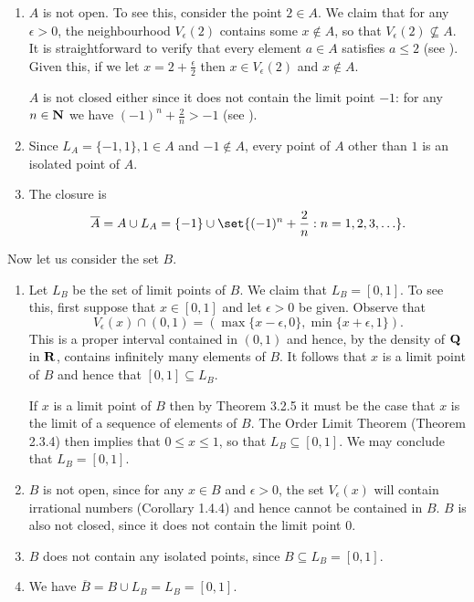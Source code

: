 \documentclass{lew98_solutions}
\begin{document}
\begin{solution}
\begin{enumerate}
        \item \( A \) is not open. To see this, consider the point \( 2 \in A \). We claim that for any \( \epsilon > 0 \), the neighbourhood \( V_{\epsilon}(2) \) contains some \( x \not\in A \), so that \( V_{\epsilon}(2) \not\subseteq A \). It is straightforward to verify that every element \( a \in A \) satisfies \( a \leq 2 \) (see ). Given this, if we let \( x = 2 + \tfrac{\epsilon}{2} \) then \( x \in V_{\epsilon}(2) \) and \( x \not\in A \).

        \( A \) is not closed either since it does not contain the limit point \( -1 \): for any \( n \in \mathbf{N} \) we have \( (-1)^n + \tfrac{2}{n} > -1 \) (see ).

        \item Since \( L_A = \{ -1, 1 \}, 1 \in A \) and \( -1 \not\in A \), every point of \( A \) other than \( 1 \) is an isolated point of \( A \).

        \item The closure is
        \[
            \overline{A} = A \cup L_A = \{ -1 \} \cup \set{ (-1)^n + \frac{2}{n} : n = 1, 2, 3, \ldots }.
        \]
    \end{enumerate}

    Now let us consider the set \( B \).
    \begin{enumerate}
        \item Let \( L_B \) be the set of limit points of \( B \). We claim that \( L_B = [0, 1] \). To see this, first suppose that \( x \in [0, 1] \) and let \( \epsilon > 0 \) be given. Observe that
        \[
            V_{\epsilon}(x) \cap (0, 1) = (\max \{ x - \epsilon, 0 \}, \min \{ x + \epsilon, 1 \}).
        \]
        This is a proper interval contained in \( (0, 1) \) and hence, by the density of \( \mathbf{Q} \) in \( \mathbf{R} \), contains infinitely many elements of \( B \). It follows that \( x \) is a limit point of \( B \) and hence that \( [0, 1] \subseteq L_B \).
        
        If \( x \) is a limit point of \( B \) then by Theorem 3.2.5 it must be the case that \( x \) is the limit of a sequence of elements of \( B \). The Order Limit Theorem (Theorem 2.3.4) then implies that \( 0 \leq x \leq 1 \), so that \( L_B \subseteq [0, 1] \). We may conclude that \( L_B = [0, 1] \).

        \item \( B \) is not open, since for any \( x \in B \) and \( \epsilon > 0 \), the set \( V_{\epsilon}(x) \) will contain irrational numbers (Corollary 1.4.4) and hence cannot be contained in \( B \). \( B \) is also not closed, since it does not contain the limit point \( 0 \).

        \item \( B \) does not contain any isolated points, since \( B \subseteq L_B = [0, 1] \).

        \item We have \( \overline{B} = B \cup L_B = L_B = [0, 1] \).
    \end{enumerate}
\end{solution}
\end{document}
